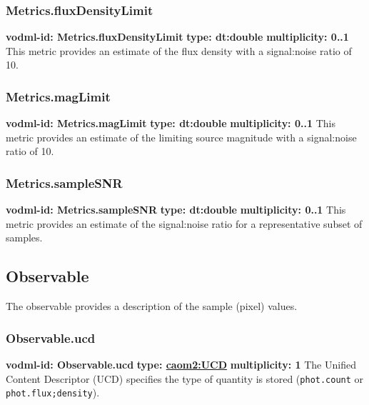     \subsubsection{Metrics.fluxDensityLimit}
      \textbf{vodml-id: Metrics.fluxDensityLimit} \newline
      \textbf{type: dt:double} \newline
      \textbf{multiplicity: 0..1} \newline
      This metric provides an estimate of the flux density with a signal:noise ratio of 10.

    \subsubsection{Metrics.magLimit}
      \textbf{vodml-id: Metrics.magLimit} \newline
      \textbf{type: dt:double} \newline
      \textbf{multiplicity: 0..1} \newline
      This metric provides an estimate of the limiting source magnitude with a signal:noise ratio of 10.

    \subsubsection{Metrics.sampleSNR}
      \textbf{vodml-id: Metrics.sampleSNR} \newline
      \textbf{type: dt:double} \newline
      \textbf{multiplicity: 0..1} \newline
      This metric provides an estimate of the signal:noise ratio for a representative subset of samples.

  \subsection{Observable}
  \label{sect:Observable}
    The observable provides a description of the sample (pixel) values.

    \subsubsection{Observable.ucd}
      \textbf{vodml-id: Observable.ucd} \newline
      \textbf{type: \hyperref[sect:UCD]{caom2:UCD}} \newline
      \textbf{multiplicity: 1} \newline
      The Unified Content Descriptor (UCD) specifies the type of quantity is stored (\verb|phot.count| or \verb|phot.flux;density|).

